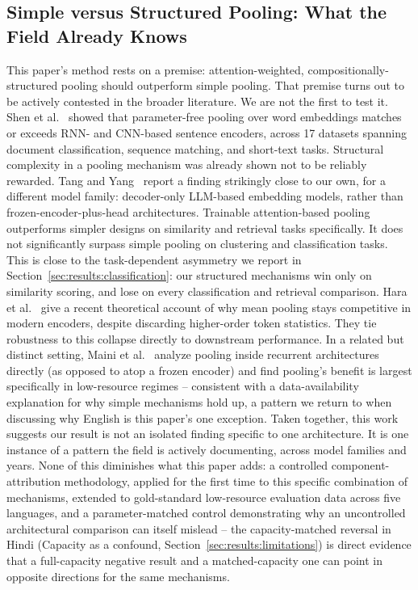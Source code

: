 \documentclass[manuscript]{acmart}
\begin{document}
\subsection{Simple versus Structured Pooling: What the Field Already Knows}
\label{sec:related-pooling}

This paper's method rests on a premise: attention-weighted, compositionally-structured pooling should outperform simple pooling. That premise turns out to be actively contested in the broader literature. We are not the first to test it. Shen et al.~\citep{shen2018baseline} showed that parameter-free pooling over word embeddings matches or exceeds RNN- and CNN-based sentence encoders, across 17 datasets spanning document classification, sequence matching, and short-text tasks. Structural complexity in a pooling mechanism was already shown not to be reliably rewarded. Tang and Yang~\citep{tang2024poolingattention} report a finding strikingly close to our own, for a different model family: decoder-only LLM-based embedding models, rather than frozen-encoder-plus-head architectures. Trainable attention-based pooling outperforms simpler designs on similarity and retrieval tasks specifically. It does not significantly surpass simple pooling on clustering and classification tasks. This is close to the task-dependent asymmetry we report in Section~\ref{sec:results:classification}: our structured mechanisms win only on similarity scoring, and lose on every classification and retrieval comparison. Hara et al.~\citep{hara2026meanpooling} give a recent theoretical account of why mean pooling stays competitive in modern encoders, despite discarding higher-order token statistics. They tie robustness to this collapse directly to downstream performance. In a related but distinct setting, Maini et al.~\citep{maini2020whypool} analyze pooling inside recurrent architectures directly (as opposed to atop a frozen encoder) and find pooling's benefit is largest specifically in low-resource regimes -- consistent with a data-availability explanation for why simple mechanisms hold up, a pattern we return to when discussing why English is this paper's one exception. Taken together, this work suggests our result is not an isolated finding specific to one architecture. It is one instance of a pattern the field is actively documenting, across model families and years. None of this diminishes what this paper adds: a controlled component-attribution methodology, applied for the first time to this specific combination of mechanisms, extended to gold-standard low-resource evaluation data across five languages, and a parameter-matched control demonstrating why an uncontrolled architectural comparison can itself mislead -- the capacity-matched reversal in Hindi (Capacity as a confound, Section~\ref{sec:results:limitations}) is direct evidence that a full-capacity negative result and a matched-capacity one can point in opposite directions for the same mechanisms.
\end{document}

